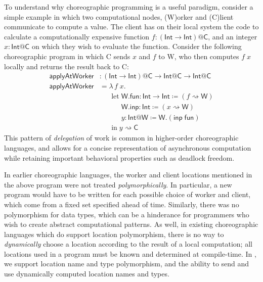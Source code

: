 To understand why choreographic programming is a useful paradigm, consider a simple example in which two computational nodes, (W)orker and (C)lient communicate to compute a value.
The client has on their local system the code to calculate a computationally expensive function $f : (\textsf{Int} \rightarrow \textsf{Int}) @ \textsf{C}$, and an integer $x : \textsf{Int} @ \textsf{C}$ on which they wish to evaluate the function.
Consider the following choreographic program in which \textsf{C} sends $x$ and $f$ to \textsf{W}, who then computes $f \; x$ locally and returns the result back to \textsf{C}:
\begin{align*}
\textsf{applyAtWorker} &: (\textsf{Int} \rightarrow \textsf{Int}) @ \textsf{C} \rightarrow \textsf{Int} @ \textsf{C} \rightarrow \textsf{Int} @ \textsf{C}\\
\textsf{applyAtWorker} &= \lambda\, f \; x.\\
&\;\;\;\;\;\; \text{let}\; \textsf{W}.\textsf{fun} : \textsf{Int} \rightarrow \textsf{Int} \coloneq (f \rightsquigarrow \textsf{W})\\
&\;\;\;\;\;\;\;\;\;\;\; \textsf{W}.\textsf{inp} : \textsf{Int} \coloneq (x \rightsquigarrow \textsf{W})\\
&\;\;\;\;\;\;\;\;\;\;\; y : \textsf{Int} @ \textsf{W} \coloneq \textsf{W}.(\textsf{inp} \; \textsf{fun})\\
&\;\;\;\;\;\; \text{in}\; y \rightsquigarrow \textsf{C}
\end{align*}
This pattern of \emph{delegation} of work is common in higher-order choreographic languages, and allows for a concise representation of asynchronous computation while retaining important behavioral properties such as deadlock freedom.

In earlier choreographic languages, the worker and client locations mentioned in the above program were not treated \emph{polymorphically}.
In particular, a new program would have to be written for each possible choice of worker and client, which come from a fixed set specified ahead of time.
Similarly, there was no polymorphism for data types, which can be a hinderance for programmers who wish to create abstract computational patterns.
As well, in existing choreographic languages which do support location polymorphism, there is no way to \emph{dynamically} choose a location according to the result of a local computation; all locations used in a program must be known and determined at compile-time.
In \langname{}, we support location name and type polymorphism, and the ability to send and use dynamically computed location names and types.

